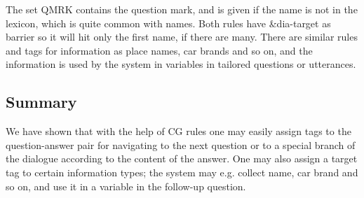 \documentclass[11pt]{article}
\begin{document}
The set QMRK contains the question mark, and is given if the name is not in the lexicon, which is quite common with names. Both rules have \&dia-target as barrier so it will hit only the first name, if there are many. There are similar rules and tags for information as place names, car brands and so on, and the information is used by the system in variables in tailored questions or utterances.




 


\subsection{Summary}
We have shown that with the help of CG rules one may easily assign tags to the question-answer pair for navigating to the next question or to a special branch of the dialogue according to the content of the answer. One may also assign a target tag to certain information types; the system may e.g. collect name, car brand and so on, and use it in a variable in the follow-up question.
 
\end{document}
